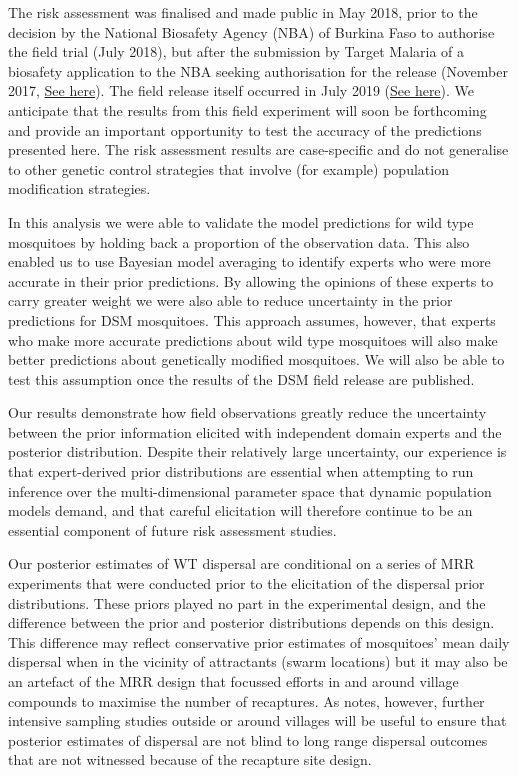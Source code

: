 \documentclass[]{bmcart}
\begin{document}
The risk assessment was finalised and made public in May 2018, prior to the decision by the National Biosafety Agency (NBA) of Burkina Faso to authorise the field trial (July 2018), but after the submission by Target Malaria of a biosafety application to the NBA seeking authorisation for the release (November 2017, \href{https://targetmalaria.org/resources/library/?category=development-pathway}{See here}). The field release itself occurred in July 2019 (\href{https://tinyurl.com/y4qr9lc5}{See here}). We anticipate that the results from this field experiment will soon be forthcoming and provide an important opportunity to test the accuracy of the predictions presented here. The risk assessment results are case-specific and do not generalise to other genetic control strategies that involve (for example) population modification strategies.

In this analysis we were able to validate the model predictions for wild type mosquitoes by holding back a proportion of the observation data. This also enabled us to use Bayesian model averaging to identify experts who were more accurate in their prior predictions. By allowing the opinions of these experts to carry greater weight we were also able to reduce uncertainty in the prior predictions for DSM mosquitoes. This approach assumes, however, that experts who make more accurate predictions about wild type mosquitoes will also make better predictions about genetically modified mosquitoes. We will also be able to test this assumption once the results of the DSM field release are published.

Our results demonstrate how field observations greatly reduce the uncertainty between the prior information elicited with independent domain experts and the posterior distribution. Despite their relatively large uncertainty, our experience is that expert-derived prior distributions are essential when attempting to run inference over the multi-dimensional parameter space that dynamic population models demand, and that careful elicitation will therefore continue to be an essential component of future risk assessment studies.

Our posterior estimates of WT dispersal are conditional on a series of MRR experiments that were conducted prior to the elicitation of the dispersal prior distributions. These priors played no part in the experimental design, and the difference between the prior and posterior distributions depends on this design. This difference may reflect conservative prior estimates of mosquitoes' mean daily dispersal when in the vicinity of attractants (swarm locations) but it may also be an artefact of the MRR design that focussed efforts in and around village compounds to maximise the number of recaptures. As \cite{Epopa2017} notes, however, further intensive sampling studies outside or around villages will be useful to ensure that posterior estimates of dispersal are not blind to long range dispersal outcomes that are not witnessed because of the recapture site design.
\end{document}
